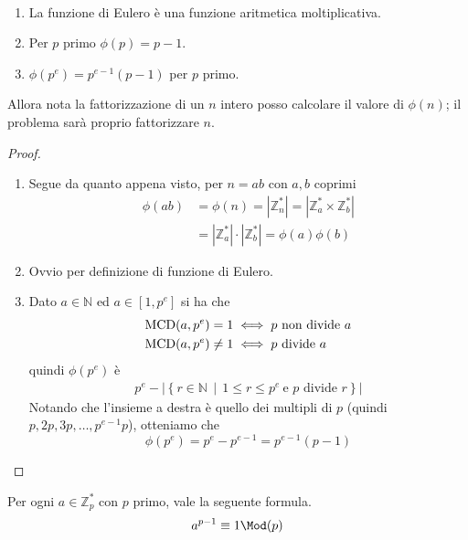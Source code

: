 \begin{proposizione}\
	\begin{enumerate}
		\item La funzione di Eulero è una funzione aritmetica moltiplicativa.
		\item Per $p$ primo $\phi(p)=p-1$.
		\item $\phi(p^e)=p^{e-1}(p-1)$ per $p$ primo.
	\end{enumerate}
	Allora nota la fattorizzazione di un $n$ intero posso calcolare il valore di $\phi(n)$; il problema sarà proprio fattorizzare $n$.
\end{proposizione}
\begin{proof}\
	\begin{enumerate}
		\item Segue da quanto appena visto, per $n=ab$ con $a,b$ coprimi
		\begin{align*}
		\phi(ab)&=\phi(n)=|\mathbb{Z}_n^*|=|\mathbb{Z}_a^*\times\mathbb{Z}_b^*|\\
		&=|\mathbb{Z}_a^*|\cdot|\mathbb{Z}_b^*|=\phi(a)\phi(b)
		\end{align*}
		\item Ovvio per definizione di funzione di Eulero.
		\item Dato $a\in\mathbb{N}$ ed $a\in[1,p^e]$ si ha che
		\begin{align*}
		\operatorname{\mathrm{MCD}}(a,p^e)=1&\iff \text{$p$ non divide $a$}\\
		\operatorname{\mathrm{MCD}}(a,p^e)\neq1&\iff \text{$p$ divide $a$}
		\end{align*}
		quindi $\phi(p^e)$ è
		\begin{align*}
		p^e-\left|\left\{r\in\mathbb{N} \, \mid \, 1\leq r\leq p^e \ \text{e $p$ divide $r$}\right\}\right|
		\end{align*}
		Notando che l'insieme a destra è quello dei multipli di $p$ (quindi $p,2p,3p,\dots,p^{e-1}p$), otteniamo che 
		\begin{equation*}
		\phi(p^e)=p^e-p^{e-1}=p^{e-1}(p-1)
		\end{equation*}
	\end{enumerate}
\end{proof}
\begin{teorema}
	Per ogni $a\in\mathbb{Z}_p^*$ con $p$ primo, vale la seguente formula.
	\begin{equation*}
	a^{p-1}\equiv1\Mod(p)
	\end{equation*}
\end{teorema}
